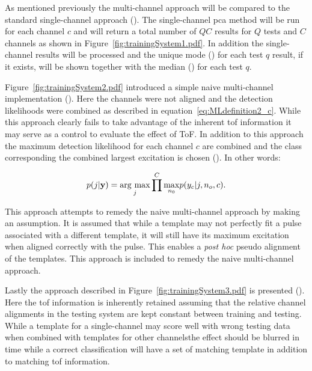 As mentioned previously the multi-channel approach will be compared to the standard single-channel approach (). The single-channel \DIFdelbegin {}\DIFdelend \DIFaddbegin \gls{pca} \DIFaddend method will be run for each channel $c$ and will return a total number of $QC$ results for $Q$ tests and $C$ channels as shown in Figure~\ref{fig:trainingSystem1.pdf}. In addition the single-channel results will be processed and the unique mode () for each test $q$ result, if it exists, will be shown together with the median () for each test $q$.

Figure~\ref{fig:trainingSystem2.pdf} introduced a simple naive multi-channel implementation (). Here the channels were not aligned and the detection likelihoods were combined as described in equation~\ref{eq:MLdefinition2_c}. While this approach clearly fails to take advantage of the inherent \DIFdelbegin {}\DIFdelend \DIFaddbegin \gls{tof} \DIFaddend information it may serve as a control to evaluate the effect of ToF. In addition to this approach the maximum detection likelihood for each channel $c$ are combined and the class corresponding the combined largest excitation is chosen (). In other words:

\begin{equation}\label{eq:jointprob3_c}
p(j|\textbf{y}) = \underset{j}{\mathrm{arg~max}} \prod^C \underset{n_0}{\max} p(y_c|j,n_o,c).
\end{equation}

This approach attempts to remedy the naive multi-channel approach by making an assumption. It is assumed that while a template may not perfectly fit a pulse associated with a different template, it will still have its maximum excitation when aligned correctly with the pulse. This enables a \emph{post hoc} pseudo alignment of the templates. This approach is included to remedy the naive multi-channel approach.

Lastly the approach described in Figure~\ref{fig:trainingSystem3.pdf} is presented (). Here the \DIFdelbegin {}\DIFdelend \DIFaddbegin \gls{tof} \DIFaddend information is inherently retained assuming that the relative channel alignments in the testing system are kept constant between training and testing. While a template for a single-channel may score well with wrong testing data when combined with templates for other channels\DIFaddbegin \DIFadd{, }\DIFaddend the effect should be blurred in time while a correct classification will have a set of matching template in addition to matching \DIFdelbegin {}\DIFdelend \DIFaddbegin \gls{tof} \DIFaddend information.

